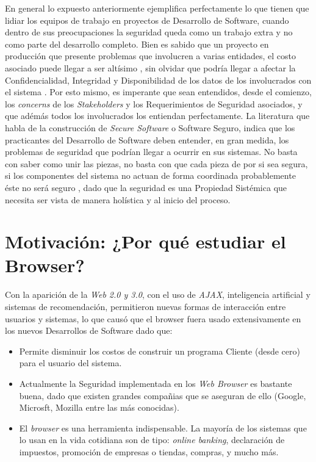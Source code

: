 En general lo expuesto anteriormente ejemplifica perfectamente lo que tienen que lidiar los equipos de trabajo en proyectos de Desarrollo de Software, cuando dentro de sus preocupaciones la seguridad queda como un trabajo extra y no como parte del desarrollo completo. Bien es sabido que un proyecto en producción que presente problemas que involucren a varias entidades, el costo asociado puede llegar a ser altísimo \cite{cert}, sin olvidar que podría llegar a afectar la Confidencialidad, Integridad y Disponibilidad de los datos de los involucrados con el sistema  \cite{interCoursera}. Por esto mismo, es imperante que sean entendidos, desde el comienzo, los \textit{concerns} de los \textit{Stakeholders} y los Requerimientos de Seguridad asociados, y que adémás todos los involucrados los entiendan perfectamente. La literatura que habla de la construcción de \textit{Secure Software} o Software Seguro, indica que los practicantes del Desarrollo de Software deben entender, en gran medida, los problemas de seguridad que podrían llegar a ocurrir en sus sistemas. No basta con saber como unir las piezas, no basta con que cada pieza de por si sea segura, si los componentes del sistema no actuan de forma coordinada probablemente éste no será seguro \cite{fernandez2013security}, dado que la seguridad es una Propiedad Sistémica que necesita ser vista de manera holística y al inicio del proceso.  


\section{Motivación: ¿Por qué estudiar el Browser?}
\label{chap1:motiv}

Con la aparición de la \textit{Web 2.0 y 3.0}, con el uso de \textit{AJAX}, inteligencia artificial y sistemas de recomendación, permitieron nuevas formas de interacción entre usuarios y sistemas, lo que causó que el browser fuera usado extensivamente en los nuevos Desarrollos de Software dado que:
\begin{itemize}
	\item Permite disminuir los costos de construir un programa Cliente (desde cero) para el usuario del sistema.
	\item Actualmente la Seguridad implementada en los \textit{Web Browser} es bastante buena, dado que existen grandes compañias que se aseguran de ello (Google, Microsft, Mozilla entre las más conocidas). 
	\item El \textit{browser} es una herramienta indispensable. La mayoría de los sistemas que lo usan en la vida cotidiana son de tipo: \textit{online banking}, declaración de impuestos, promoción de empresas o tiendas, compras, y mucho más.
\end{itemize}

